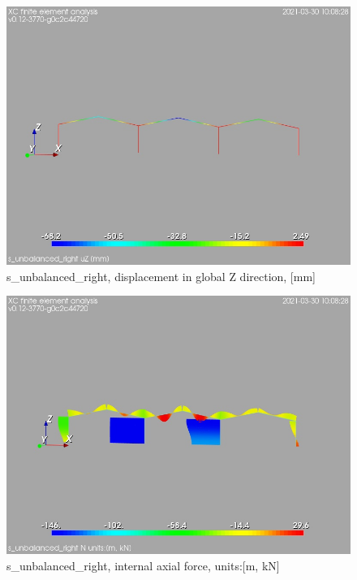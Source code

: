 \begin{figure}
\begin{center}
\includegraphics[width=\linewidth]{calc_results/sole_zeinali/text/graphics/resSimplLC/s_unbalanced_righttotaluZ}
\caption{s_unbalanced_right, displacement in global Z direction, [mm]}
\end{center}
\end{figure}
\begin{figure}
\begin{center}
\includegraphics[width=\linewidth]{calc_results/sole_zeinali/text/graphics/resSimplLC/s_unbalanced_rightallMemberSetN}
\caption{s_unbalanced_right, internal axial force, units:[m, kN]}
\end{center}
\end{figure}
